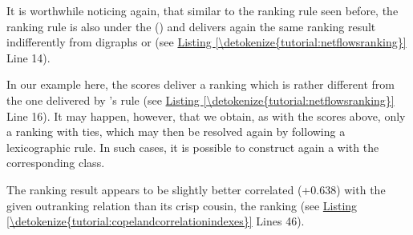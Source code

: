 \documentclass[a4paper,12pt,english]{sphinxhowto}
\begin{document}
It is worthwhile noticing again, that similar to the  ranking rule seen before, the  ranking rule is also  under the {\hyperref[\detokenize{tutorial:codual-transform-label}]{}} () and delivers again the same ranking result indifferently from digraphs  or  (see \hyperref[\detokenize{tutorial:netflowsranking}]{Listing \ref{\detokenize{tutorial:netflowsranking}}} Line 14).

In our example here, the  scores deliver  a ranking  which is rather different from the one delivered by ’s rule (see \hyperref[\detokenize{tutorial:netflowsranking}]{Listing \ref{\detokenize{tutorial:netflowsranking}}} Line 16). It may happen, however, that we obtain, as with the  scores above, only a ranking with ties, which may then be resolved again by following a lexicographic rule. In such cases, it is possible to construct again a  with the corresponding  class.

The  ranking result appears to be slightly better correlated (+0.638) with the given outranking relation than its crisp cousin, the  ranking (see \hyperref[\detokenize{tutorial:copelandcorrelationindexes}]{Listing \ref{\detokenize{tutorial:copelandcorrelationindexes}}} Lines 4\sphinxhyphen{}6).
\def\sphinxLiteralBlockLabel{\label{\detokenize{tutorial:netflowscorrelationindexes}}}
\begin{sphinxVerbatim}[commandchars=\\\{\},numbers=left,firstnumber=1,stepnumber=1]
  
\end{sphinxVerbatim}
\end{document}
